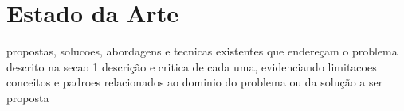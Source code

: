 
\chapter{Estado da Arte}

propostas, solucoes, abordagens e tecnicas existentes que endereçam o problema descrito na secao 1
descrição e critica de cada uma, evidenciando limitacoes
conceitos e padroes relacionados ao dominio do problema ou da solução a ser proposta